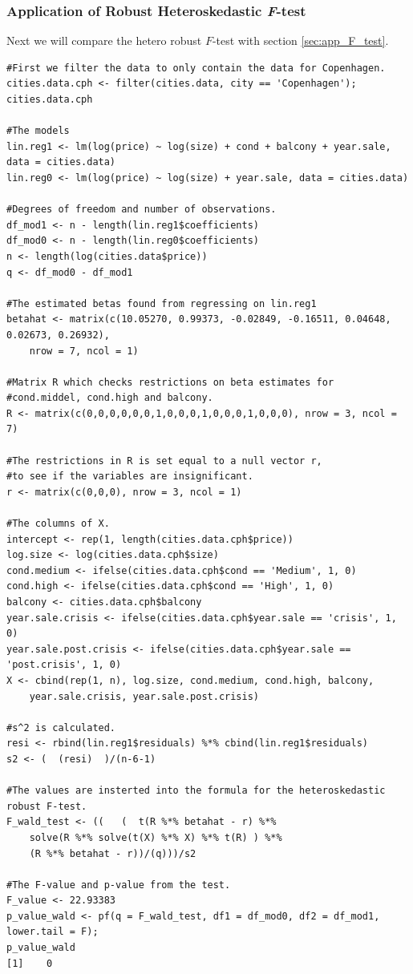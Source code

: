 \subsubsection{Application of Robust Heteroskedastic \textit{F}-test}
Next we will compare the hetero robust $F$-test with section \ref{sec:app_F_test}. 
\begin{lstlisting}
#First we filter the data to only contain the data for Copenhagen. 
cities.data.cph <- filter(cities.data, city == 'Copenhagen'); cities.data.cph

#The models
lin.reg1 <- lm(log(price) ~ log(size) + cond + balcony + year.sale, data = cities.data)
lin.reg0 <- lm(log(price) ~ log(size) + year.sale, data = cities.data)

#Degrees of freedom and number of observations. 
df_mod1 <- n - length(lin.reg1$coefficients)
df_mod0 <- n - length(lin.reg0$coefficients)
n <- length(log(cities.data$price))
q <- df_mod0 - df_mod1

#The estimated betas found from regressing on lin.reg1
betahat <- matrix(c(10.05270, 0.99373, -0.02849, -0.16511, 0.04648, 0.02673, 0.26932),
    nrow = 7, ncol = 1)

#Matrix R which checks restrictions on beta estimates for 
#cond.middel, cond.high and balcony. 
R <- matrix(c(0,0,0,0,0,0,1,0,0,0,1,0,0,0,1,0,0,0), nrow = 3, ncol = 7)

#The restrictions in R is set equal to a null vector r, 
#to see if the variables are insignificant. 
r <- matrix(c(0,0,0), nrow = 3, ncol = 1)

#The columns of X. 
intercept <- rep(1, length(cities.data.cph$price))
log.size <- log(cities.data.cph$size)
cond.medium <- ifelse(cities.data.cph$cond == 'Medium', 1, 0)
cond.high <- ifelse(cities.data.cph$cond == 'High', 1, 0)
balcony <- cities.data.cph$balcony
year.sale.crisis <- ifelse(cities.data.cph$year.sale == 'crisis', 1, 0)
year.sale.post.crisis <- ifelse(cities.data.cph$year.sale == 'post.crisis', 1, 0)
X <- cbind(rep(1, n), log.size, cond.medium, cond.high, balcony, 
    year.sale.crisis, year.sale.post.crisis)

#s^2 is calculated. 
resi <- rbind(lin.reg1$residuals) %*% cbind(lin.reg1$residuals)
s2 <- (  (resi)  )/(n-6-1)

#The values are insterted into the formula for the heteroskedastic robust F-test. 
F_wald_test <- ((   (  t(R %*% betahat - r) %*% 
    solve(R %*% solve(t(X) %*% X) %*% t(R) ) %*% 
    (R %*% betahat - r))/(q)))/s2

#The F-value and p-value from the test. 
F_value <- 22.93383
p_value_wald <- pf(q = F_wald_test, df1 = df_mod0, df2 = df_mod1, lower.tail = F); 
p_value_wald
[1]    0
\end{lstlisting}

